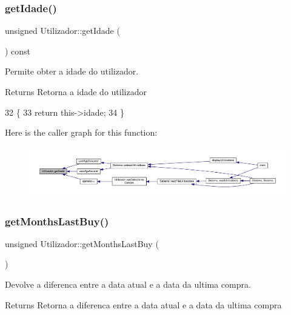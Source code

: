 \subsubsection{\texorpdfstring{get\+Idade()}{getIdade()}}
{\footnotesize\ttfamily unsigned Utilizador\+::get\+Idade (\begin{DoxyParamCaption}{ }\end{DoxyParamCaption}) const}



Permite obter a idade do utilizador. 

\begin{DoxyReturn}{Returns}
Retorna a idade do utilizador 
\end{DoxyReturn}

\begin{DoxyCode}
32                                     \{
33     \textcolor{keywordflow}{return} this->idade;
34 \}
\end{DoxyCode}
Here is the caller graph for this function\+:
\nopagebreak
\begin{figure}[H]
\begin{center}
\leavevmode
\includegraphics[width=350pt]{classUtilizador_adff93f098f9512263fcbd1cdadf20855_icgraph}
\end{center}
\end{figure}
\mbox{\label{classUtilizador_a8c4c3275a56142c31f19c7af78e3c88f}} 
\subsubsection{\texorpdfstring{get\+Months\+Last\+Buy()}{getMonthsLastBuy()}}
{\footnotesize\ttfamily unsigned Utilizador\+::get\+Months\+Last\+Buy (\begin{DoxyParamCaption}{ }\end{DoxyParamCaption})}



Devolve a diferenca entre a data atual e a data da ultima compra. 

\begin{DoxyReturn}{Returns}
Retorna a diferenca entre a data atual e a data da ultima compra 
\end{DoxyReturn}

